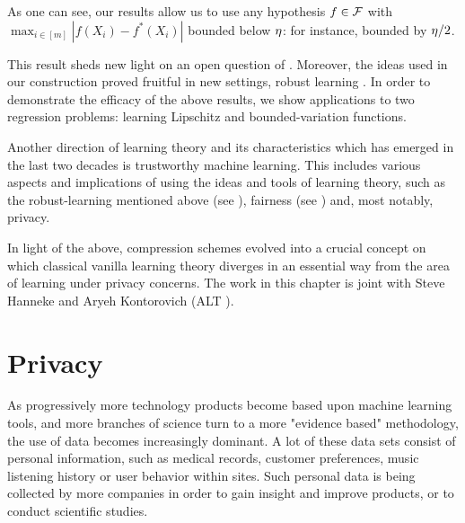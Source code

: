 \documentclass[12pt,a4paper,oneside,onecolumn]{book}
\begin{document}
As one can see, our results allow us to use any hypothesis $f \in \mathcal{F}$ with 
$\max_{i \in [m]} |f(X_{i}) - f^{*}(X_{i})|$ bounded below $\eta$: for instance, 
bounded by $\eta / 2$.

This result sheds new light on an open
question of \citet{DBLP:journals/siamcomp/Simon97}. 
Moreover, the ideas used in our construction proved fruitful in new settings, robust learning \citet{pmlr-v99-montasser19a}.
In order to demonstrate the efficacy of the above results, we show applications to two regression problems:
learning Lipschitz and bounded-variation functions.


Another direction of learning theory and its characteristics which has emerged in the last two decades is trustworthy machine learning. This includes various aspects and implications of using the ideas and tools of learning theory, such as the robust-learning mentioned above (see \citet{DBLP:conf/alt/AttiasKM19, https://doi.org/10.48550/arxiv.1706.06083, https://doi.org/10.48550/arxiv.1412.6572}), fairness (see \citet{dwork2012fairness, pmlr-v80-kearns18a}) and, most notably, privacy.

In light of the above, compression schemes evolved into a crucial  concept on which classical vanilla learning theory diverges in an essential way from the area of learning under privacy concerns.
The work in this chapter is joint with Steve Hanneke and Aryeh Kontorovich (ALT \citeyear{pmlr-v98-hanneke19a}).
\section{Privacy}

%
%

As progressively more technology products become based upon machine learning tools, and more branches of science turn to a more "evidence based" methodology, the use of data becomes increasingly dominant. A lot of these data sets consist of personal information, such as medical records, customer preferences, music listening history or user behavior within sites. Such personal data is being collected by more companies in order to gain insight and improve products, or to conduct scientific studies.
\end{document}
